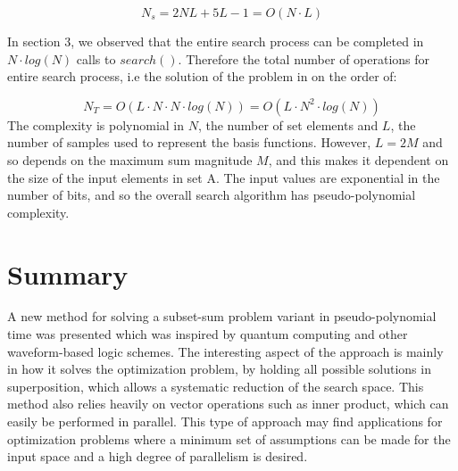 \documentclass[reqno]{amsart}
\theoremstyle{definition}
\theoremstyle{remark}
\begin{document}
\begin{equation}
N_s = 2NL + 5L - 1 = O(N \cdot L)
\end{equation}

\noindent
In section 3, we observed that the entire search process can be completed in $N\cdot log(N)$ calls to $search()$. Therefore the total number of operations for entire search process, i.e the solution of the problem in on the order of:

\begin{equation}
N_T= O( L \cdot N \cdot N \cdot log(N) ) = O( L \cdot N^2 \cdot log(N) )
\end{equation}
\noindent
The complexity is polynomial in $N$, the number of set elements and $L$, the number of samples used to represent the basis functions. However, $L = 2M$ and so depends on the maximum sum magnitude $M$, and this makes it dependent on the size of the input elements in set A. The input values are exponential in the number of bits, and so the overall search algorithm has pseudo-polynomial complexity.



\section{Summary}
A new method for solving a subset-sum problem variant in pseudo-polynomial time was presented which was inspired by quantum computing and other waveform-based logic schemes. The interesting aspect of the approach is mainly in how it solves the optimization problem, by holding all possible solutions in superposition, which allows a systematic reduction of the search space. This method also relies heavily on vector operations such as inner product, which can easily be performed in parallel. This type of approach may find applications for optimization problems where a minimum set of assumptions can be made for the input space and a high degree of parallelism is desired.





\end{document}
